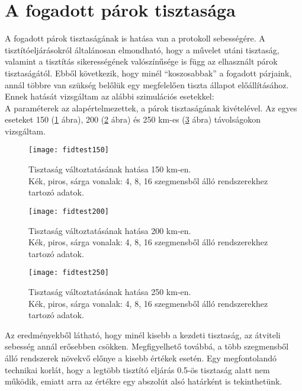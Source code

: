 \section{A fogadott párok tisztasága}
A fogadott párok tisztaságának is hatása van a protokoll sebességére. A tisztítóeljárásokról általánosan elmondható, hogy a művelet utáni tisztaság, valamint a tisztítás sikerességének valószínűsége is függ az elhasznált párok tisztaságától. Ebből következik, hogy minél ``koszosabbak'' a fogadott párjaink, annál többre van szükség belőlük egy megfelelően tiszta állapot előállításához. Ennek hatását vizsgáltam az alábbi szimulációs esetekkel:\\
A paraméterek az alapértelmezettek, a párok tisztaságának kivételével. Az egyes eseteket 150 (\ref{fig:fid150} ábra), 200 (\ref{fig:fid200} ábra) és 250 km-es  (\ref{fig:fid250} ábra) távolságokon vizsgáltam.
\begin{figure}[H]
\centering
\texttt{[image: fidtest150]}
\caption[Tisztaság hatása 150]
{Tisztaság változtatásának hatása 150 km-en.\\ 
Kék, piros, sárga vonalak: 4, 8, 16 szegmensből álló rendszerekhez tartozó adatok.\\}
\label{fig:fid150}
\end{figure}
\begin{figure}[H]
\centering
\texttt{[image: fidtest200]}
\caption[Tisztaság hatása 200]
{Tisztaság változtatásának hatása 200 km-en.\\ 
Kék, piros, sárga vonalak: 4, 8, 16 szegmensből álló rendszerekhez tartozó adatok.\\}
\label{fig:fid200}
\end{figure}
\begin{figure}[H]
\centering
\texttt{[image: fidtest250]}
\caption[Tisztaság hatása 250]
{Tisztaság változtatásának hatása 250 km-en.\\ 
Kék, piros, sárga vonalak: 4, 8, 16 szegmensből álló rendszerekhez tartozó adatok.\\}
\label{fig:fid250}
\end{figure}
Az eredményekből látható, hogy minél kisebb a kezdeti tisztaság, az átviteli sebesség annál erősebben csökken. Megfigyelhető továbbá, a több szegmensből álló rendszerek növekvő előnye a kisebb értékek esetén. Egy megfontolandó technikai korlát, hogy a legtöbb tisztító eljárás 0.5-ös tisztaság alatt nem működik, emiatt arra az értékre egy abszolút alsó határként is tekinthetünk.

